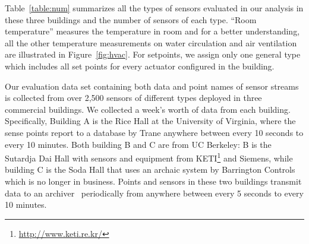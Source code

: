 Table~\ref{table:num} summarizes all the types of sensors evaluated in our analysis in these three buildings and the number of sensors of each type. ``Room temperature'' measures the temperature in room and for a better understanding, all the other temperature measurements on water circulation and air ventilation are illustrated in Figure~\ref{fig:hvac}. For setpoints, we assign only
one general type which includes all set points for every actuator configured in the building.

Our evaluation data set containing both data and point names of sensor streams is collected from over 2,500 sensors of different types deployed in three commercial buildings. 
We collected a week's worth of data from each building.
Specifically, Building A is the Rice Hall at the University of Virginia, where the sense points report to a database by Trane anywhere between every 10 seconds to every 10 minutes.
Both building B and C are from UC Berkeley: B is the Sutardja Dai Hall with sensors and equipment from KETI\footnote{\url{http://www.keti.re.kr/}}  and Siemens, while building C is the Soda Hall that uses an archaic system by Barrington Controls which is no longer in business. 
Points and sensors in these two buildings transmit data to an archiver~\cite{smap} periodically from anywhere between every 5 seconds to every 10 minutes.


